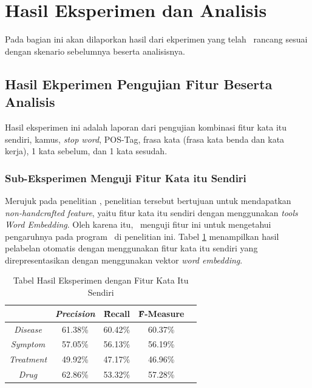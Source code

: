 \section{Hasil Eksperimen dan Analisis}
Pada bagian ini akan dilaporkan hasil dari ekperimen yang telah \saya~rancang sesuai dengan skenario sebelumnya beserta analisisnya. 
	\subsection{Hasil Ekperimen Pengujian Fitur Beserta Analisis}
	
	Hasil eksperimen ini adalah laporan dari pengujian kombinasi fitur kata itu sendiri, kamus, \textit{stop word}, POS-Tag, frasa kata (frasa kata benda dan kata kerja), 1 kata sebelum, dan 1 kata sesudah.
	  
	\subsubsection{Sub-Eksperimen Menguji Fitur Kata itu Sendiri}
	Merujuk pada penelitian \cite{mujiono2016new}, penelitian tersebut bertujuan untuk mendapatkan \textit{non-handcrafted feature}, yaitu fitur kata itu sendiri dengan menggunakan \textit{tools Word Embedding}. Oleh karena itu, \saya~menguji fitur ini untuk mengetahui pengaruhnya pada program \mer~di penelitian ini. Tabel \ref{table:own1} menampilkan hasil pelabelan otomatis dengan menggunakan fitur kata itu sendiri yang direpresentasikan dengan menggunakan vektor \textit{word embedding}.
	
	\begin{table}
	    \centering
	    \caption{Tabel Hasil Eksperimen dengan Fitur Kata Itu Sendiri}
	    \begin{tabular}{|c|c|c|c|c|}
	      \hline
						      & \textit{Precision} & \f{\f{Recall}} & \f{\f{F-Measure}} \\ \hline
	      \textit{Disease}    & 61.38\%             & 60.42\%        & 60.37\%           \\ \hline
	      \textit{Symptom}    & 57.05\%             & 56.13\%        & 56.19\%           \\ \hline
	      \textit{Treatment}  & 49.92\%             & 47.17\%        & 46.96\%           \\ \hline
	      \textit{Drug}		  & 62.86\%             & 53.32\%        & 57.28\%           \\ \hline
	    \end{tabular}
	    \label{table:own1}
	\end{table}
	
